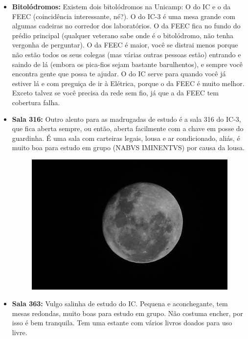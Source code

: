 \begin{itemize}
    \item  \textbf{Bitolódromos:} Existem dois bitolódromos na Unicamp: O do IC
        e o da FEEC (coincidência interessante, né?). O do IC-3 é uma mesa
        grande com algumas cadeiras no corredor dos laboratórios. O da FEEC fica
        no fundo do prédio principal (qualquer veterano sabe onde é o
        bitolódromo, não tenha vergonha de perguntar). O da FEEC é maior, você
        se distrai menos porque não estão todos os seus colegas (mas várias
        outras pessoas estão) entrando e saindo de lá (embora os pica-fios sejam
        bastante barulhentos), e sempre você encontra gente que possa te ajudar.
        O do IC serve para quando você já estiver lá e com preguiça de ir à
        Elétrica, porque o da FEEC é muito melhor. Exceto talvez se você precisa
        da rede sem fio, já que a da FEEC tem cobertura falha.

    \item  \textbf{Sala 316:} Outro alento para as madrugadas de estudo é a sala
        316 do IC-3, que fica aberta sempre, ou então, aberta facilmente com a
        chave em posse do guardinha. É uma sala com carteiras legais, lousa e ar
        condicionado, aliás, é muito boa para estudo em grupo (NABVS IMINENTVS)
        por causa da lousa.

        \begin{figure}[h!]
            \centering
            \includegraphics[scale=0.50, keepaspectratio=true]{img/imgs/11-lugares_estudar/-076.jpg}
        \end{figure}

    \item  \textbf{Sala 363:} Vulgo salinha de estudo do IC. Pequena e
        aconchegante, tem mesas redondas, muito boas para estudo em grupo. Não
        costuma encher, por isso é bem tranquila. Tem uma estante com vários
        livros doados para uso livre.


\end{itemize}
